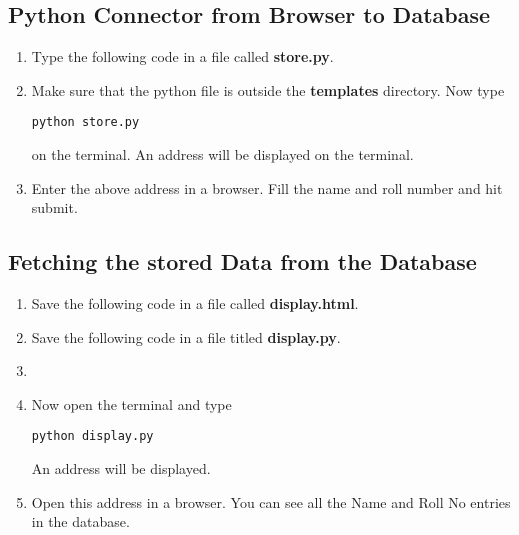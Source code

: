 \documentclass[journal,12pt,twocolumn]{IEEEtran}
\begin{document}
\subsection{Python Connector from Browser to Database}
\begin{enumerate}
\item Type the following code in a file called \textbf{store.py}.

\item Make sure that the python file is outside the \textbf{templates} directory.  Now type
\begin{lstlisting}
python store.py
\end{lstlisting}
on the terminal. An address will be displayed on the terminal.
\item Enter the above address in a browser.  Fill the name and roll number and hit submit.
\end{enumerate}

\subsection{Fetching the stored Data from the Database}
\begin{enumerate}
\item Save the following code in a file called \textbf{display.html}.


\item %
Save the following code in a file titled  \textbf{display.py}.    
\item 

\item Now open the terminal and type 
\begin{lstlisting}
python display.py
\end{lstlisting}
An address will be displayed.
\item Open this address in a browser. You can see all the Name and Roll No entries in the database.
\end{enumerate}
\end{document}
